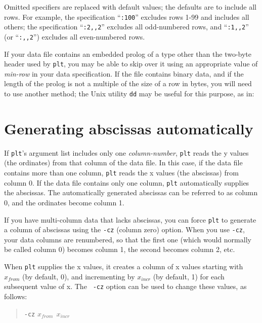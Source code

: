 \documentclass{book}
\begin{document}
Omitted specifiers are replaced with default values; the defaults are to
include all rows.  For example, the specification ``{\tt :100}'' excludes rows
1-99 and includes all others; the specification ``{\tt :2,,2}'' excludes all
odd-numbered rows, and ``{\tt :1,,2}'' (or ``{\tt :,,2}'') excludes all
even-numbered rows.

%
%
If your data file contains an embedded prolog of a type other than the
two-byte header used by {\tt plt}, you may be able to skip over it
using an appropriate value of {\em min-row} in your data
specification.  If the file contains binary data, and if the length of
the prolog is not a multiple of the size of a row in bytes, you will
need to use another method; the Unix utility {\tt dd} may be useful
for this purpose, as in:

\begin{center}
\end{center}


\section{Generating abscissas automatically \label{sec:gen-abs}}

%
If {\tt plt}'s argument list includes only one {\em column-number},
{\tt plt} reads the y values (the ordinates) from that column of the
data file.  In this case, if the data file contains more than one
column, {\tt plt} reads the x values (the abscissas) from column 0.
If the data file contains only one column, {\tt plt} automatically
supplies the abscissas.  The automatically generated abscissas can be
referred to as column 0, and the ordinates become column 1.

%
If you have multi-column data that lacks abscissas, you can force
{\tt plt} to generate a column of abscissas using the {\tt -cz} (column
zero) option.  When you use {\tt -cz}, your data columns are renumbered,
so that the first one (which would normally be called column 0) becomes
column 1, the second becomes column 2, etc.

When {\tt plt} supplies the x values, it creates a column of x values
starting with $x_{from}$ (by default, 0), and incrementing by
$x_{incr}$ (by default, 1) for each subsequent value of x.  The {\tt
-cz} option can be used to change these values, as follows:
\begin{quote}
{\tt -cz} $x_{from} \ \ x_{incr}$
\end{quote}
\end{document}
